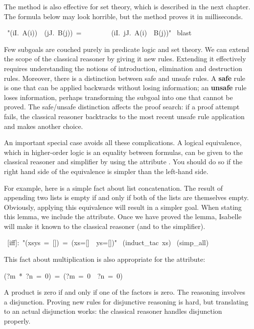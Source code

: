 The  method is also effective for set theory, which is
described in the next chapter.  The formula below may look horrible, but
the  method proves it in milliseconds. 
\begin{isabelle}
\ "({\isasymUnion}i{\isasymin}I.\ A(i))\ \isasyminter\ ({\isasymUnion}j{\isasymin}J.\ B(j))\ =\isanewline
\ \ \ \ \ \ \ \ ({\isasymUnion}i{\isasymin}I.\ {\isasymUnion}j{\isasymin}J.\ A(i)\ \isasyminter\ B(j))"\isanewline
{}\ blast
\end{isabelle}

Few subgoals are couched purely in predicate logic and set theory.
We can extend the scope of the classical reasoner by giving it new rules. 
Extending it effectively requires understanding the notions of
introduction, elimination and destruction rules.  Moreover, there is a
distinction between  safe and unsafe rules. A 
\textbf{safe} rule is one that can be applied 
backwards without losing information; an
\textbf{unsafe} rule loses  information, perhaps
transforming the subgoal into one that cannot be proved.  The safe/unsafe
distinction affects the proof search: if a proof attempt fails, the
classical reasoner backtracks to the most recent unsafe rule application
and makes another choice. 

An important special case avoids all these complications.  A logical 
equivalence, which in higher-order logic is an equality between 
formulas, can be given to the classical 
reasoner and simplifier by using the attribute .  You 
should do so if the right hand side of the equivalence is  
simpler than the left-hand side.  

For example, here is a simple fact about list concatenation. 
The result of appending two lists is empty if and only if both 
of the lists are themselves empty. Obviously, applying this equivalence 
will result in a simpler goal. When stating this lemma, we include 
the  attribute. Once we have proved the lemma, Isabelle 
will make it known to the classical reasoner (and to the simplifier). 
\begin{isabelle}
\
[iff]:\ "(xs{\isacharat}ys\ =\ [])\ =\
(xs=[]\ \isasymand\ ys=[])"\isanewline
{}\ (induct_tac\ xs)\isanewline
\isacommand{apply}\ (simp_all)\isanewline
\isacommand{done}
\end{isabelle}
%
This fact about multiplication is also appropriate for 
the  attribute:
\begin{isabelle}
(\mbox{?m}\ *\ \mbox{?n}\ =\ 0)\ =\ (\mbox{?m}\ =\ 0\ \isasymor\ \mbox{?n}\ =\ 0)
\end{isabelle}
A product is zero if and only if one of the factors is zero.  The
reasoning  involves a disjunction.  Proving new rules for
disjunctive reasoning  is hard, but translating to an actual disjunction
works:  the classical reasoner handles disjunction properly.


